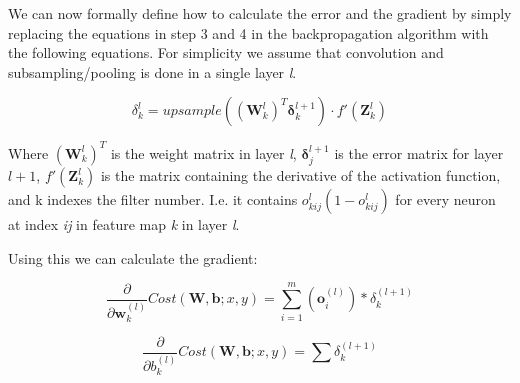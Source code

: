 We can now formally define how to calculate the error and the gradient by simply replacing the equations in step 3 and 4 in the backpropagation algorithm with the following equations. For simplicity we assume that convolution and subsampling/pooling is done in a single layer \textit{l}.




\begin{equation}
	\delta_{k}^{l} =  upsample( (\mathbf{W}_{k}^l)^T \mathbf{\delta}_{k}^{l+1})\cdot f'(\mathbf{Z}_k^l)
\end{equation}

Where $  (\mathbf{W}_{k}^l)^T $ is the weight matrix in layer \textit{l}, $  \mathbf{\delta}_{j}^{l+1} $ is the error matrix for layer $ l + 1 $, $ f'(\mathbf{Z}_k^l) $ is the matrix containing the derivative of the activation function, and k indexes the filter number. I.e. it contains $ o_{kij}^l(1-o_{kij}^l) $ for every neuron at index \textit{ij} in feature map \textit{k} in layer \textit{l}. 

Using this we can calculate the gradient:

\begin{equation}
	\frac{\partial}{\partial \mathbf{w}_k^{(l)} }Cost(\mathbf{W,b}; x, y) = \sum_{i=1}^{m}(\mathbf{o}_i^{(l)})*\delta_k^{(l+1)}
\end{equation}

\begin{equation}
	\frac{\partial}{\partial b_k^{(l)} }Cost(\mathbf{W,b}; x, y) = \sum\delta_k^{(l+1)}
\end{equation}












